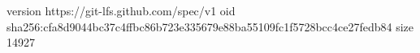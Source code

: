 version https://git-lfs.github.com/spec/v1
oid sha256:cfa8d9044bc37c4ffbc86b723e335679e88ba55109fc1f5728bcc4ce27fedb84
size 14927
